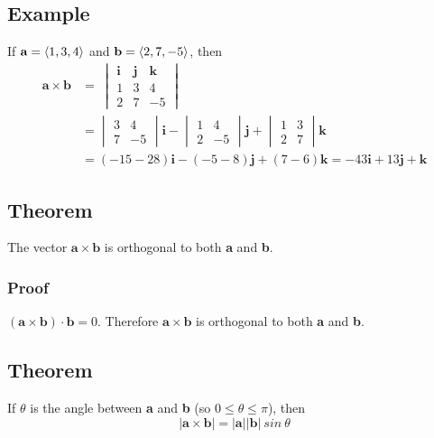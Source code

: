 \subsection*{Example}
If $\textbf{a}=\ev{1,3,4}$ and $\textbf{b}=\ev{2,7,-5}$, then
\begin{align*}
    \mathbf{a\times b} & =\
    \begin{vmatrix}
        \textbf{i} & \textbf{j} & \textbf{k} \\
        1          & 3          & 4          \\
        2          & 7          & -5
    \end{vmatrix}                                                                                                               \\
                       & =\begin{vmatrix}
        3 & 4  \\
        7 & -5
    \end{vmatrix}\textbf{i} - \begin{vmatrix}
        1 & 4  \\
        2 & -5
    \end{vmatrix}\textbf{j} + \begin{vmatrix}
        1 & 3 \\
        2 & 7
    \end{vmatrix}\textbf{k} \\
                       & =(-15-28)\textbf{i}-(-5-8)\textbf{j}+(7-6)\textbf{k}=-43\textbf{i}+13\textbf{j}+\textbf{k}
\end{align*}


\subsection*{Theorem}
The vector $\mathbf{a\times b}$ is orthogonal to both \textbf{a} and \textbf{b}.

\subsubsection*{Proof} $\mathbf{(a\times b)\cdot b}=0$. Therefore $\mathbf{a\times b}$
is orthogonal to both \textbf{a} and \textbf{b}.

\subsection*{Theorem}
If $\theta$ is the angle between \textbf{a} and \textbf{b} (so $0\leq \theta \leq \pi$), then
$$|\mathbf{a\times b}|=\mathbf{|a||b|}\:sin\:\theta$$

